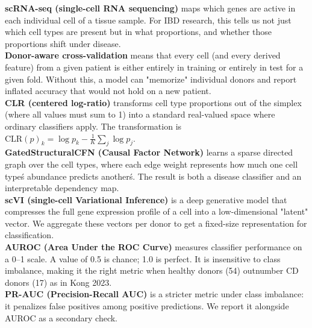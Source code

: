 \documentclass[11pt,letterpaper]{article}
\begin{document}
\tableofcontents
\newpage

\begin{tcolorbox}[
  colback=gray!6,
  colframe=gray!40,
  arc=4pt,
  boxrule=0.6pt,
  title={\textbf{Key concepts — read this first}},
  fonttitle=\bfseries\small,
  fontupper=\small,
  left=6pt, right=6pt, top=4pt, bottom=4pt
]
\textbf{scRNA-seq (single-cell RNA sequencing)} maps which genes are active in each individual cell of a tissue sample. For IBD research, this tells us not just which cell types are present but in what proportions, and whether those proportions shift under disease.\\[4pt]
\textbf{Donor-aware cross-validation} means that every cell (and every derived feature) from a given patient is either entirely in training or entirely in test for a given fold. Without this, a model can "memorize" individual donors and report inflated accuracy that would not hold on a new patient.\\[4pt]
\textbf{CLR (centered log-ratio)} transforms cell type proportions out of the simplex (where all values must sum to 1) into a standard real-valued space where ordinary classifiers apply. The transformation is $\text{CLR}(p)_k = \log p_k - \frac{1}{K}\sum_j \log p_j$.\\[4pt]
\textbf{GatedStructuralCFN (Causal Factor Network)} learns a sparse directed graph over the cell types, where each edge weight represents how much one cell type\'s abundance predicts another\'s. The result is both a disease classifier and an interpretable dependency map.\\[4pt]
\textbf{scVI (single-cell Variational Inference)} is a deep generative model that compresses the full gene expression profile of a cell into a low-dimensional "latent" vector. We aggregate these vectors per donor to get a fixed-size representation for classification.\\[4pt]
\textbf{AUROC (Area Under the ROC Curve)} measures classifier performance on a 0--1 scale. A value of 0.5 is chance; 1.0 is perfect. It is insensitive to class imbalance, making it the right metric when healthy donors (54) outnumber CD donors (17) as in Kong 2023.\\[4pt]
\textbf{PR-AUC (Precision-Recall AUC)} is a stricter metric under class imbalance: it penalizes false positives among positive predictions. We report it alongside AUROC as a secondary check.
\end{tcolorbox}
\vspace{8pt}
\end{document}
